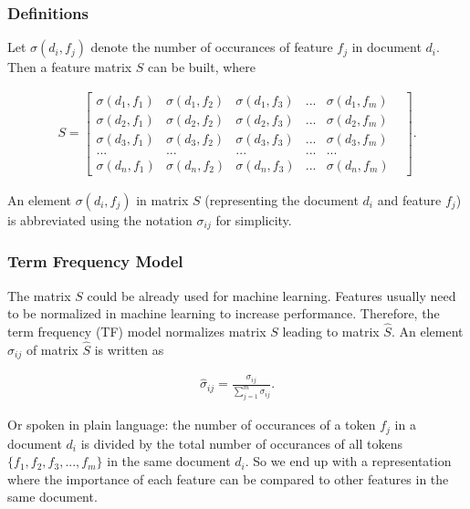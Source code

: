 \documentclass[a4paper,12pt,nottoc]{article}
\begin{document}
\subsubsection{Definitions}

Let $\sigma(d_i, f_j)$ denote the number of occurances of feature $f_j$ in document $d_i$. Then a feature matrix $S$ can be built, where

\begin{gather}
S =
\begin{bmatrix}
\sigma(d_1, f_1) & \sigma(d_1, f_2) & \sigma(d_1, f_3) & ... & \sigma(d_1, f_m) \\
\sigma(d_2, f_1) & \sigma(d_2, f_2) & \sigma(d_2, f_3) & ... & \sigma(d_2, f_m) \\
\sigma(d_3, f_1) & \sigma(d_3, f_2) & \sigma(d_3, f_3) & ... & \sigma(d_3, f_m) \\
... & ... & ... & ... & ... & \\
 \sigma(d_n, f_1) & \sigma(d_n, f_2) & \sigma(d_n, f_3) & ... & \sigma(d_n, f_m)
\end{bmatrix}.
\end{gather}

\noindent An element $\sigma(d_i, f_j)$ in matrix $S$ (representing the document $d_i$ and feature $f_j$) is abbreviated using the notation $\sigma_{ij}$ for simplicity.

\subsubsection{Term Frequency Model}

The matrix $S$ could be already used for machine learning. Features usually need to be normalized in machine learning to increase performance. Therefore, the term frequency (TF) model normalizes matrix $S$ leading to matrix $\hat{S}$. An element $\hat{\sigma}_{ij}$ of matrix $\hat{S}$ is written as

\begin{gather}\label{eq:tf}
\hat{\sigma}_{ij} = \frac{\sigma_{ij}}{\sum_{j=1}^{m}\sigma_{ij}}.
\end{gather}

\noindent Or spoken in plain language: the number of occurances of a token $f_j$ in a document $d_i$ is divided by the total number of occurances of all tokens $\{f_1, f_2, f_3, ..., f_m\}$ in the same document $d_i$. So we end up with a representation where the importance of each feature can be compared to other features in the same document.
\end{document}
